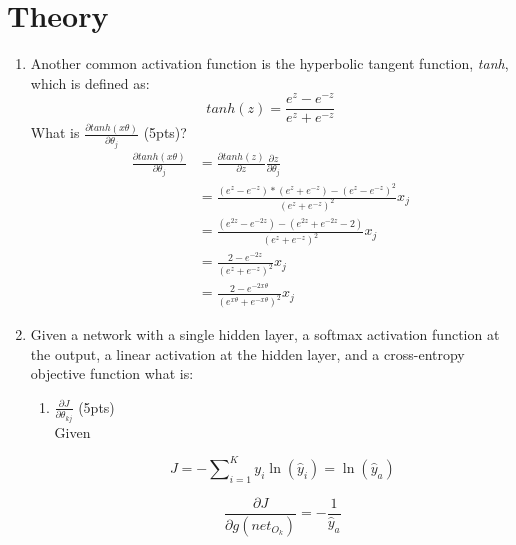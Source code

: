 \documentclass[12pt]{article}
\begin{document}
\maketitle






\section{Theory}
\begin{enumerate}
\item Another common activation function is the hyperbolic tangent function, \emph{tanh}, which is defined as:
\begin{equation}
tanh(z) = \frac{e^z-e^{-z}}{e^z+e^{-z}}
\end{equation}
What is $\frac{\partial tanh(x\theta)}{\partial \theta_j}$ (5pts)?\\

\begin{align*}
\frac{\partial tanh(x\theta)}{\partial \theta_j} &= \frac{\partial tanh(z)}{\partial z}\frac{\partial z}{\partial \theta_j} \\ &= \frac{(e^z-e^{-z})*(e^z+e^{-z})-(e^z-e^{-z})^2}{(e^z+e^{-z})^2}x_j \\&= \frac{(e^{2z}-e^{-2z})-(e^{2z}+e^{-2z}-2)}{(e^z+e^{-z})^2}x_j \\&= \frac{2-e^{-2z}}{(e^z+e^{-z})^2}x_j \\&= \frac{2-e^{-2x\theta}}{(e^{x\theta}+e^{-x\theta})^2}x_j
\end{align*}

\item Given a network with a single hidden layer, a softmax activation function at the output, a linear activation at the hidden layer, and a cross-entropy objective function what is:
\begin{enumerate}
\item $\frac{\partial J}{\partial \theta_{kj}}$ (5pts)\\
Given

\[J =  - \sum\nolimits_{i = 1}^K {{y_i}} \ln \left( {{{\hat y}_i}} \right) = \ln \left( {{{\hat y}_a}} \right)\]

\[\frac{{\partial J}}{{\partial g\left( {net_{{O_k}}} \right)}} = -\frac{1}{{{{\hat y}_a}}}\]


\end{enumerate}
\end{enumerate}
\end{document}
